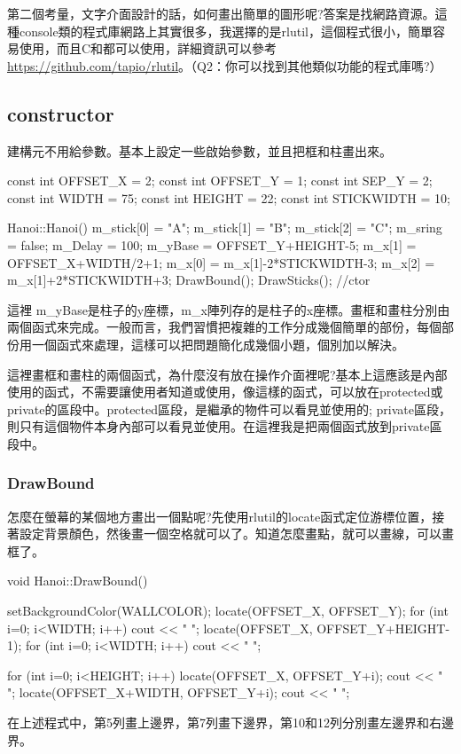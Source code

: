 \documentclass[12pt,a4paper]{article}
\begin{document}
第二個考量，文字介面設計的話，如何畫出簡單的圖形呢?答案是找網路資源。這種console類的程式庫網路上其實很多，我選擇的是rlutil，這個程式很小，簡單容易使用，而且C和\cc{}都可以使用，詳細資訊可以參考\url{https://github.com/tapio/rlutil}。（Q2：你可以找到其他類似功能的程式庫嗎?）

\subsection{constructor}
建構元不用給參數。基本上設定一些啟始參數，並且把框和柱畫出來。
\begin{cppcode}
const int OFFSET_X = 2;
const int OFFSET_Y = 1;
const int SEP_Y = 2;
const int WIDTH = 75;
const int HEIGHT = 22;
const int STICKWIDTH = 10;
	
Hanoi::Hanoi()
{
	m_stick[0] = "A";
	m_stick[1] = "B";
	m_stick[2] = "C";
	m_sring = false;
	m_Delay = 100;
	m_yBase = OFFSET_Y+HEIGHT-5;
	m_x[1] = OFFSET_X+WIDTH/2+1;
	m_x[0] = m_x[1]-2*STICKWIDTH-3;
	m_x[2] = m_x[1]+2*STICKWIDTH+3;
	DrawBound();
	DrawSticks();
	//ctor
}
\end{cppcode}
這裡 m\_yBase是柱子的y座標，m\_x陣列存的是柱子的x座標。畫框和畫柱分別由兩個函式來完成。一般而言，我們習慣把複雜的工作分成幾個簡單的部份，每個部份用一個函式來處理，這樣可以把問題簡化成幾個小題，個別加以解決。

這裡畫框和畫柱的兩個函式，為什麼沒有放在操作介面裡呢?基本上這應該是內部使用的函式，不需要讓使用者知道或使用，像這樣的函式，可以放在protected或private的區段中。protected區段，是繼承的物件可以看見並使用的; private區段，則只有這個物件本身內部可以看見並使用。在這裡我是把兩個函式放到private區段中。

\subsubsection{DrawBound}
怎麼在螢幕的某個地方畫出一個點呢?先使用rlutil的locate函式定位游標位置，接著設定背景顏色，然後畫一個空格就可以了。知道怎麼畫點，就可以畫線，可以畫框了。
\begin{cppcode}
void Hanoi::DrawBound()
{
	setBackgroundColor(WALLCOLOR);
	locate(OFFSET_X, OFFSET_Y);
	for (int i=0; i<WIDTH; i++) cout << " ";
	locate(OFFSET_X, OFFSET_Y+HEIGHT-1);
	for (int i=0; i<WIDTH; i++) cout << " ";
	
	for (int i=0; i<HEIGHT; i++) {
		locate(OFFSET_X, OFFSET_Y+i);
		cout << "  ";
		locate(OFFSET_X+WIDTH, OFFSET_Y+i);
		cout << "  ";
	}
}
\end{cppcode}
在上述程式中，第5列畫上邊界，第7列畫下邊界，第10和12列分別畫左邊界和右邊界。
\end{document}
